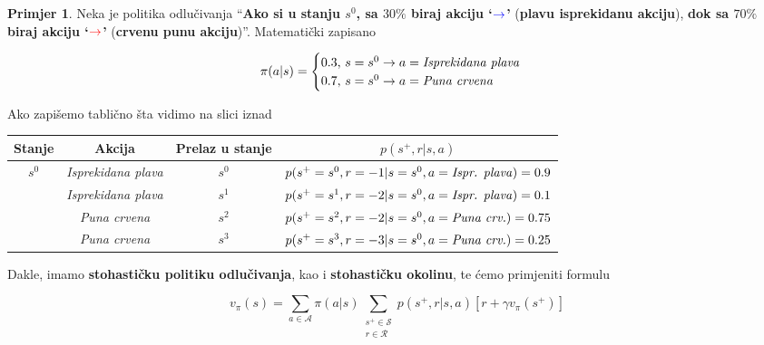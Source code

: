 \documentclass[12pt]{IEEEtran}
\numberwithin{equation}{subsection}
\numberwithin{figure}{subsection}
\theoremstyle{definition}
\newtheorem{example}{Primjer}
\numberwithin{example}{section}
\begin{document}
\begin{example}
Neka je politika odlu\v{c}ivanja \enquote{\textbf{Ako si u stanju 
$s^{0}$, sa $30\%$ biraj akciju 
\enquote{$\begingroup \color{blue} \mathbf{\rightarrow} \endgroup$}} (\textbf{plavu isprekidanu akciju}),
\textbf{dok sa $70\%$ biraj akciju \enquote{$\begingroup \color{red} \mathbf{\rightarrow} \endgroup$}} 
(\textbf{crvenu punu akciju})}. Matemati\v{c}ki zapisano 

\begin{equation}
    \pi(a | s) = \begin{cases}
        0.3 \text{, } s = s^{0} \rightarrow a = \text{\textit{Isprekidana plava}}\\
        0.7 \text{, } s = s^{0} \rightarrow a = \text{\textit{Puna crvena}}
    \end{cases} 
\end{equation}

Ako zapi\v{s}emo tabli\v{c}no \v{s}ta vidimo na slici iznad

\begin{table}[h]
    \normalsize
    \centering
    \begin{tabular}{*4c}
        \textbf{Stanje} & \textbf{Akcija} & \textbf{Prelaz u stanje} & $p(s^{+}, r | s, a)$\\      
        \toprule 
        \multirow{4}{*}{$s^{0}$} & \textit{Isprekidana plava} & $s^{0}$ & $p(s^{+} = s^{0}, r = -1 | s = s^{0}, a = \text{\textit{Ispr. plava}}) = 0.9$\\
        \cline{2-4}
        & \textit{Isprekidana plava} & $s^{1}$ & $p(s^{+} = s^{1}, r = -2 | s = s^{0}, a = \text{\textit{Ispr. plava}}) = 0.1$\\  
        \cline{2-4}
        & \textit{Puna crvena} & $s^{2}$ & $p(s^{+} = s^{2}, r = -2 | s = s^{0}, a = \text{\textit{Puna crv.}}) = 0.75$\\  
        \cline{2-4}
        & \textit{Puna crvena} & $s^{3}$ & $p(s^{+} = s^{3}, r = -3 | s = s^{0}, a = \text{\textit{Puna crv.}}) = 0.25$\\  
        \cline{2-4}
    \end{tabular}
    
\end{table}

Dakle, imamo \textbf{stohasti\v{c}ku politiku odlu\v{c}ivanja}, kao 
i \textbf{stohasti\v{c}ku okolinu}, te \'{c}emo primjeniti formulu 

\begin{equation}
    v_{\pi}(s) = \sum_{a \in \mathcal{A}}{\pi(a | s) \sum_{\substack{s^{+} \in \mathcal{S}\\r \in \mathcal{R}}}{p(s^{+}, r | s, a) \left[r + \gamma v_{\pi}(s^{+}) \right]}}
\end{equation}


\end{example}
\end{document}
